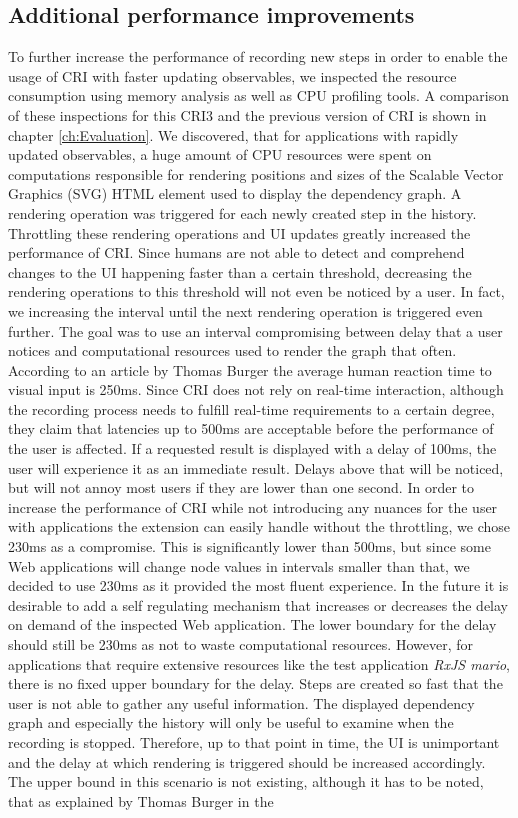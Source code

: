 \subsection{Additional performance improvements}
\label{sec:additonPerformance}
To further increase the performance of recording new steps in order to enable the usage of CRI with faster updating observables, we inspected the resource consumption using memory analysis as well as CPU profiling tools. A comparison of these inspections for this CRI3 and the previous version of CRI is shown in chapter \ref{ch:Evaluation}. We discovered, that for applications with rapidly updated observables, a huge amount of CPU resources were spent on computations responsible for rendering positions and sizes of the Scalable Vector Graphics (SVG) HTML element used to display the dependency graph. A rendering operation was triggered for each newly created step in the history. Throttling these rendering operations and UI updates greatly increased the performance of CRI. Since humans are not able to detect and comprehend changes to the UI happening faster than a certain threshold, decreasing the rendering operations to this threshold will not even be noticed by a user. In fact, we increasing the interval until the next rendering operation is triggered even further. The goal was to use an interval compromising between delay that a user notices and computational resources used to render the graph that often. According to an article by Thomas Burger \cite{Perception} the average human reaction time to visual input is 250ms. Since CRI does not rely on real-time interaction, although the recording process needs to fulfill real-time requirements to a certain degree, they claim that latencies up to 500ms are acceptable before the performance of the user is affected. If a requested result is displayed with a delay of 100ms, the user will experience it as an immediate result. Delays above that will be noticed, but will not annoy most users if they are lower than one second. In order to increase the performance of CRI while not introducing any nuances for the user with applications the extension can easily handle without the throttling, we chose 230ms as a compromise. This is significantly lower than 500ms, but since some Web applications will change node values in intervals smaller than that, we decided to use 230ms as it provided the most fluent experience. In the future it is desirable to add a self regulating mechanism that increases or decreases the delay on demand of the inspected Web application. The lower boundary for the delay should still be 230ms as not to waste computational resources. However, for applications that require extensive resources like the test application \emph{RxJS mario}, there is no fixed upper boundary for the delay. Steps are created so fast that the user is not able to gather any useful information. The displayed dependency graph and especially the history will only be useful to examine when the recording is stopped. Therefore, up to that point in time, the UI is unimportant and the delay at which rendering is triggered should be increased accordingly. The upper bound in this scenario is not existing, although it has to be noted, that as explained by Thomas Burger in the 